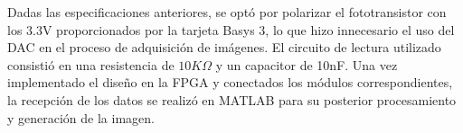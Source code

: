 Dadas las especificaciones anteriores, se optó por polarizar el fototransistor con los 3.3V proporcionados por la tarjeta Basys 3, lo que hizo innecesario el uso del DAC en el proceso de adquisición de imágenes. El circuito de lectura utilizado consistió en una resistencia de $10K\Omega$ y un capacitor de 10nF. Una vez implementado el diseño en la FPGA y conectados los módulos correspondientes, la recepción de los datos se realizó en MATLAB para su posterior procesamiento y generación de la imagen.